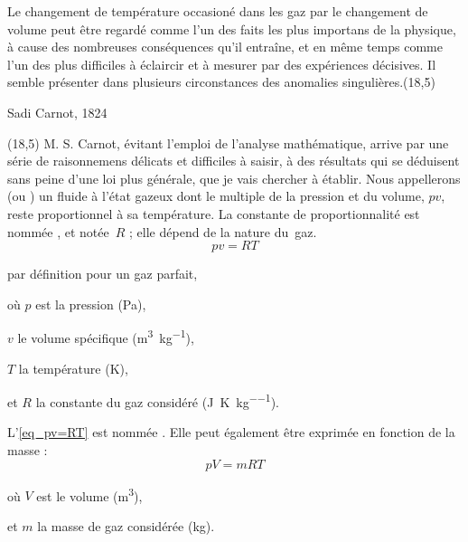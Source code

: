 			Le changement de température occasioné dans les gaz par le changement de volume peut être regardé comme l’un des faits les plus importans de la physique, à cause des nombreuses conséquences qu’il entraîne, et en même temps comme l’un des plus difficiles à éclaircir et à mesurer par des expériences décisives. Il semble présenter dans plusieurs circonstances des anomalies singulières.\nolinebreak\makebox(18,5){\color{gray}}\par\vspace{-0.3cm}\begin{flushright}Sadi Carnot, 1824~\cite{carnot1824}\end{flushright}%
		\makebox(18,5){\color{gray}}
		M. S. Carnot, évitant l’emploi de l’analyse mathématique, arrive par une série de raisonnemens délicats et difficiles à saisir, à des résultats qui se déduisent sans peine d’une loi plus générale, que je vais chercher à établir.
		Nous appellerons  (ou ) un fluide à l’état gazeux dont le multiple de la pression et du volume, $p v$, reste proportionnel à sa température. La constante de proportionnalité est nommée , et notée~$R$ ; elle dépend de la nature du~gaz.
		\begin{equation}
			p v = R T
			\label{eq_pv=RT}
		\end{equation}
		\begin{equationterms}
			\item par définition pour un gaz parfait,
			\item où \tab $p$ \tab est la pression (\si{\pascal}),
			\item 	\tab $v$ \tab le volume spécifique (\si{\metre\cubed\per\kilogram}),
			\item 	\tab $T$ \tab la température (\si{\kelvin}),
			\item et \tab $R$ \tab la constante du gaz considéré (\si{\joule\per\kelvin\per\kilogram}).
		\end{equationterms}

		L’\cref{eq_pv=RT} est nommée . Elle peut également être exprimée en fonction de la masse :
		\begin{equation}
			p V = m R T
			\label{eq_pV=mRT}
		\end{equation}
		\begin{equationterms}
			\item où \tab $V$ \tab est le volume (\si{\metre\cubed}),
			\item et \tab $m$ \tab la masse de gaz considérée (\si{\kilogram}).
		\end{equationterms}
		
